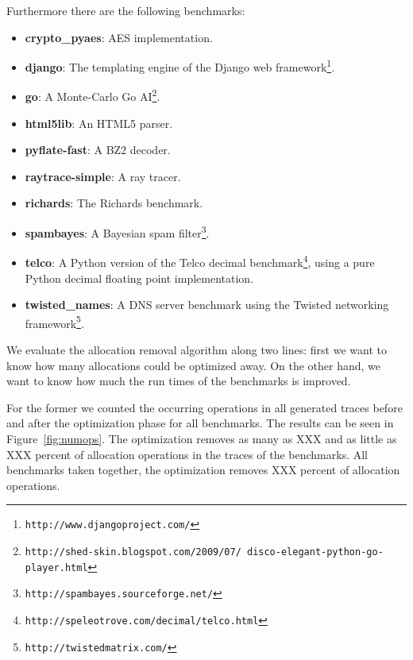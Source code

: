 \documentclass{sigplanconf}
\begin{document}
Furthermore there are the following benchmarks:
\begin{itemize}
    \item \textbf{crypto\_pyaes}: AES implementation.
    \item \textbf{django}: The templating engine of the Django web
    framework\footnote{\texttt{http://www.djangoproject.com/}}.
    \item \textbf{go}: A Monte-Carlo Go
    AI\footnote{\texttt{http://shed-skin.blogspot.com/2009/07/ disco-elegant-python-go-player.html}}.
    \item \textbf{html5lib}: An HTML5 parser.
    \item \textbf{pyflate-fast}: A BZ2 decoder.
    \item \textbf{raytrace-simple}: A ray tracer.
    \item \textbf{richards}: The Richards benchmark.
    \item \textbf{spambayes}: A Bayesian spam filter\footnote{\texttt{http://spambayes.sourceforge.net/}}.
    \item \textbf{telco}: A Python version of the Telco decimal
    benchmark\footnote{\texttt{http://speleotrove.com/decimal/telco.html}},
    using a pure Python decimal floating point implementation.
    \item \textbf{twisted\_names}: A DNS server benchmark using the Twisted networking
    framework\footnote{\texttt{http://twistedmatrix.com/}}.
\end{itemize}

We evaluate the allocation removal algorithm along two lines: first we want to
know how many allocations could be optimized away. On the other hand, we want
to know how much the run times of the benchmarks is improved.

For the former we counted the occurring operations in all generated traces
before and after the optimization phase for all benchmarks. The results can be
seen in Figure~\ref{fig:numops}. The optimization removes as many as XXX and as
little as XXX percent of allocation operations in the traces of the benchmarks.
All benchmarks taken together, the optimization removes XXX percent of
allocation operations.
\end{document}

